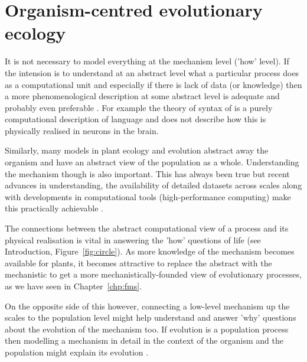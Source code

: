 


\section{Organism-centred evolutionary ecology}
It is not necessary to model everything at the mechanism level ('how' level). If
the intension is to understand at an abstract level what a particular process
does as a computational unit and especially if there is lack of data (or
knowledge) then a more phenomenological description at some abstract level is
adequate and probably even preferable \citep[see levels of description
of][Chapter 1]{marr_vision:_1982}. For example the theory of syntax of
\citet{chomsky_aspects_2014} is a purely computational description of language
and does not describe how this is physically realised in neurons in the brain.

Similarly, many models in plant ecology and evolution abstract away the organism
and have an abstract view of the population as a whole. Understanding the
mechanism though is also important. This has always been true but recent
advances in understanding, the availability of detailed datasets across scales
along with developments in computational tools (\eg high-performance computing)
make this practically achievable \citep{zhu_plants_2016,
  marshall-colon_crops_2017}.

The connections between the abstract computational view of a process and its
physical realisation is vital in answering the 'how' questions of life (see
Introduction, Figure~\ref{fig:circle}). As more knowledge of the mechanism
becomes available for plants, it becomes attractive to replace the abstract with
the mechanistic to get a more mechanistically-founded view of evolutionary
processes, as we have seen in Chapter~\ref{chp:fms}.

On the opposite side of this however, connecting a low-level mechanism up the
scales to the population level might help understand and answer 'why' questions
about the evolution of the mechanism too. If evolution is a population process
\citep{doebeli_towards_2017} then modelling a mechanism in detail in the context
of the organism and the population might explain its evolution
\citep[\enquote{Nothing in biology makes sense except in light of population
  genetics};][]{lynch_origins_2007}.

